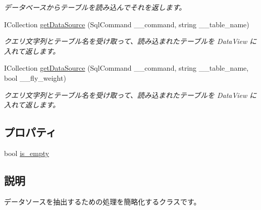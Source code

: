 \begin{DoxyCompactItemize}
\begin{DoxyCompactList}\small\item\em データベースからテーブルを読み込んでそれを返します。 \item\end{DoxyCompactList}\item 
ICollection \hyperlink{classlazurite_1_1etherial_1_1_data_source_extracter_a130cf13a793cc427e4146e27c70972a1}{getDataSource} (SqlCommand \_\-\_\-command, string \_\-\_\-table\_\-name)
\begin{DoxyCompactList}\small\item\em クエリ文字列とテーブル名を受け取って、読み込まれたテーブルを DataView に入れて返します。 \item\end{DoxyCompactList}\item 
ICollection \hyperlink{classlazurite_1_1etherial_1_1_data_source_extracter_a002f4d5a5f088770590e9df76dc43b21}{getDataSource} (SqlCommand \_\-\_\-command, string \_\-\_\-table\_\-name, bool \_\-\_\-fly\_\-weight)
\begin{DoxyCompactList}\small\item\em クエリ文字列とテーブル名を受け取って、読み込まれたテーブルを DataView に入れて返します。 \item\end{DoxyCompactList}\end{DoxyCompactItemize}
\subsection*{プロパティ}
\begin{DoxyCompactItemize}
\item 
bool \hyperlink{classlazurite_1_1etherial_1_1_data_source_extracter_aa3ab61131fb4520545ca1298b37cbb8d}{is\_\-empty}
\end{DoxyCompactItemize}


\subsection{説明}
データソースを抽出するための処理を簡略化するクラスです。 

